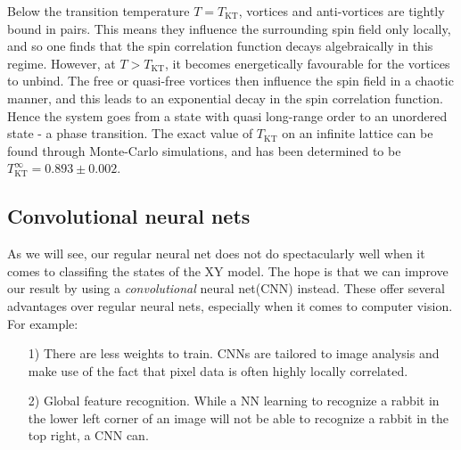 \documentclass[]{article}
\begin{document}
Below the transition temperature $T = T_\text{KT}$, vortices and anti-vortices are tightly bound in pairs. This means they influence the surrounding spin field only locally, and so one finds that the spin correlation function decays algebraically in this regime. However, at $T > T_\text{KT}$, it becomes energetically favourable for the vortices to unbind. The free or quasi-free vortices then influence the spin field in a chaotic manner, and this leads to an exponential decay in the spin correlation function. Hence the system goes from a state with quasi long-range order to an unordered state - a phase transition. The exact value of $T_\text{KT}$ on an infinite lattice can be found through Monte-Carlo simulations, and has been determined to be $T_\text{KT}^\infty = 0.893 \pm 0.002$.\cite{Olsson_1991}

\subsection{Convolutional neural nets}
As we will see, our regular neural net does not do spectacularly well when it comes to classifing the states of the XY model. The hope is that we can improve our result by using a \textit{convolutional} neural net(CNN) instead. These offer several advantages over regular neural nets, especially when it comes to computer vision. For example:

\begin{itemize}
	\item[1)] There are less weights to train. CNNs are tailored to image analysis and make use of the fact that pixel data is often highly locally correlated. 
	
	\item[2)] Global feature recognition. While a NN learning to recognize a rabbit in the lower left corner of an image will not be able to recognize a rabbit in the top right, a CNN can.
\end{itemize}
\end{document}
